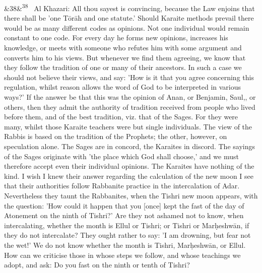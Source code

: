 \documentclass[12pt]{article}
\newcommand{\para}[1][]{\par\noindent\ifx&#1&\else\textsuperscript{\footnotesize #1}~\fi}
\begin{document}
\para[38] Al Khazari: All thou sayest is convincing, because the Law enjoins that there shall be 'one Tōrāh and one statute.' Should Karaite methods prevail there would be as many different codes as opinions. Not one individual would remain constant to one code. For every day he forms new opinions, increases his knowledge, or meets with someone who refutes him with some argument and converts him to his views. But whenever we find them agreeing, we know that they follow the tradition of one or many of their ancestors. In such a case we should not believe their views, and say: 'How is it that you agree concerning this regulation, whilst reason allows the word of God to be interpreted in various ways?' If the answer be that this was the opinion of Anan, or Benjamin, Saul,, or others, then they admit the authority of tradition received from people who lived before them, and of the best tradition, viz. that of the Sages. For they were many, whilst those Karaite teachers were but single individuals. The view of the Rabbis is based on the tradition of the Prophets; the other, however, on speculation alone. The Sages are in concord, the Karaites in discord. The sayings of the Sages originate with 'the place which God shall choose,' and we must therefore accept even their individual opinions. The Karaites have nothing of the kind. I wish I knew their answer regarding the calculation of the new moon I see that their authorities follow Rabbanite practice in the intercalation of Adar. Nevertheless they taunt the Rabbanites, when the Tishri new moon appears, with the question: 'How could it happen that you [once] kept the fast of the day of Atonement on the ninth of Tishri?' Are they not ashamed not to know, when intercalating, whether the month is Ellul or Tishri; or Tishri or Marḥeshwān, if they do not intercalate? They ought rather to say: 'I am drowning, but fear not the wet!' We do not know whether the month is Tishri, Marḥeshwān, or Ellul. How can we criticise those in whose steps we follow, and whose teachings we adopt, and ask: Do you fast on the ninth or tenth of Tishri?
\end{document}
